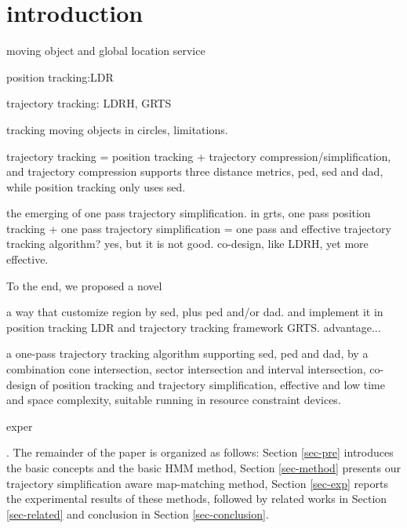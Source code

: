 

\section{introduction}
\label{sec-intro}

moving object and global location service

position tracking:LDR

trajectory tracking: LDRH, GRTS



tracking moving objects in circles, limitations.

trajectory tracking = position tracking + trajectory compression/simplification, and trajectory compression supports three distance metrics, ped, sed and dad, while position tracking only uses sed.

the emerging of one pass trajectory simplification. in grts, one pass position tracking + one pass trajectory simplification = one pass and effective trajectory tracking algorithm? yes, but it is not good. co-design, like LDRH, yet more effective.

To the end, we proposed a novel 

a way that customize region by sed, plus ped and/or dad. and implement it in position tracking LDR and trajectory tracking framework GRTS. advantage...

a one-pass trajectory tracking algorithm supporting sed, ped and dad, by a combination cone intersection, sector intersection and interval intersection, \ie co-design of position tracking and trajectory simplification, effective and low time and space complexity, suitable running in resource constraint devices.

exper

.
The remainder of the paper is organized as follows:
Section \ref{sec-pre} introduces the basic concepts and the basic HMM method,
Section \ref{sec-method} presents our trajectory simplification aware map-matching method,
Section \ref{sec-exp} reports the experimental results of these methods, followed by related works in Section \ref{sec-related} and conclusion in Section \ref{sec-conclusion}.



